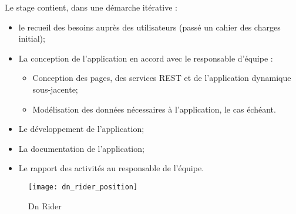 Le stage contient, dans une démarche itérative :
\begin{itemize}
  \item le recueil des besoins auprès des utilisateurs (passé un cahier des charges initial);
  \item La conception de l’application en accord avec le responsable d’équipe :
  \begin{itemize}
    \item Conception des pages, des services REST et de l’application dynamique sous-jacente;
    \item Modélisation des données nécessaires à l’application, le cas échéant.
  \end{itemize}
  \item Le développement de l’application;
  \item La documentation de l’application;
  \item Le rapport des activités au responsable de l’équipe.
\end{itemize}

\begin{figure}[ht]
 \centering
 \texttt{[image: dn\_rider\_position]}
 \caption{Dn Rider}
\end{figure}

\clearpage
